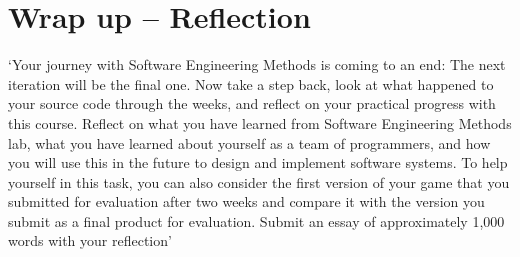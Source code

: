\chapter{Wrap up – Reflection}

`Your journey with Software Engineering Methods is coming to an end: The next iteration will be the final
one. Now take a step back, look at what happened to your source code through the weeks, and reflect on
your practical progress with this course.
Reflect on what you have learned from Software Engineering Methods lab, what you have learned about
yourself as a team of programmers, and how you will use this in the future to design and implement
software systems. To help yourself in this task, you can also consider the first version of your game that
you submitted for evaluation after two weeks and compare it with the version you submit as a final product
for evaluation. Submit an essay of approximately 1,000 words with your reflection'

